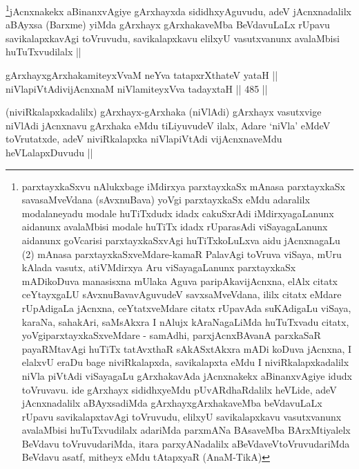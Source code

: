 \begin{artha}
\footnote{parxtayxkaSxvu nAlukxbage iMdirxya parxtayxkaSx mAnasa parxtayxkaSx savasaMveVdana (sAvxnuBava) yoVgi parxtayxkaSx eMdu adaralilx modalaneyadu modale huTiTxdudx idadx cakuSxrAdi iMdirxyagaLanunx aidanunx avalaMbisi modale huTiTx idadx rUparasAdi viSayagaLanunx aidanunx goVcarisi parxtayxkaSxvAgi huTiTxkoLuLxva aidu jAcnxnagaLu (2) mAnasa parxtayxkaSxveMdare-kamaR PalavAgi toVruva viSaya, mUru kAlada vasutx, atiVMdirxya Aru viSayagaLanunx parxtayxkaSx mADikoDuva manasisxna mUlaka Aguva paripAkavijAcnxna, elAlx citatx ceYtayxgaLU sAvxnuBavavAguvudeV savxsaMveVdana, ililx citatx eMdare rUpAdigaLa jAcnxna, ceYtatxveMdare citatx rUpavAda suKAdigaLu viSaya, karaNa, sahakAri, saMsAkxra I nAlujx kAraNagaLiMda huTuTxvadu citatx, yoVgiparxtayxkaSxveMdare - samAdhi, parxjAcnxBAvanA parxkaSaR payaRMtavAgi huTiTx tatAvxthaR sAkASxtAkxra mADi koDuva jAcnxna, I elalxvU eraDu bage niviRkalapxda, savikalapxta eMdu I niviRkalapxkadalilx  niVla piVtAdi viSayagaLu gArxhakavAda jAcnxnakekx aBinanxvAgiye idudx toVruvavu. ide gArxhayx sididhxyeMdu pUvARdhaRdalilx heVLide, adeV jAcnxnadalilx aBAyxsadiMda gArxhayxgArxhakaveMba beVdavuLaLx rUpavu savikalapxtavAgi toVruvudu, elilxyU savikalapxkavu vasutxvanunx avalaMbisi huTuTxvudilalx adariMda parxmANa BAsaveMba BArxMtiyalelx BeVdavu toVruvudariMda, itara parxyANadalilx aBeVdaveVtoVruvudariMda BeVdavu asatf, mitheyx eMdu tAtapxyaR (AnaM-TikA)}jAcnxnakekx aBinanxvAgiye gArxhayxda sididhxyAguvudu, adeV jAcnxnadalilx aBAyxsa (Barxme) yiMda gArxhayx gArxhakaveMba BeVdavuLaLx rUpavu savikalapxkavAgi toVruvudu, savikalapxkavu elilxyU vasutxvanunx avalaMbisi huTuTxvudilalx ||
\end{artha}


\begin{shl}
gArxhayxgArxhakamiteyxVvaM neYva tatapxrXthateV yataH || \\
niVlapiVtAdivijAcnxnaM niVlamiteyxVva tadayxtaH ||  485 ||  
\end{shl}

\begin{artha}
(niviRkalapxkadalilx) gArxhayx-gArxhaka (niVlAdi) gArxhayx vasutxvige niVlAdi jAcnxnavu gArxhaka eMdu tiLiyuvudeV ilalx, Adare `niVla' eMdeV toVrutatxde, adeV niviRkalapxka niVlapiVtAdi vijAcnxnaveMdu heVLalapxDuvudu ||
\end{artha}


